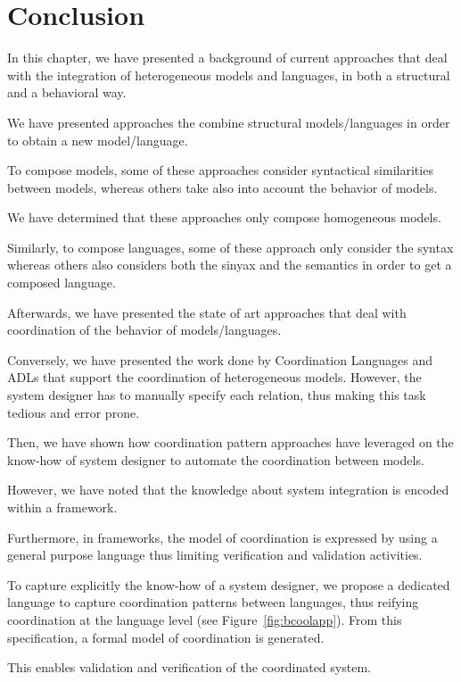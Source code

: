 \section{Conclusion}
In this chapter, we have presented a background of current approaches that deal with the integration of heterogeneous models and languages, in both a structural and a behavioral way. 

We have presented approaches the combine structural models/languages in order to obtain a new model/language. 

To compose models, some of these approaches consider syntactical similarities between models, whereas others take also into account the behavior of models. 

We have determined that these approaches only compose homogeneous models.    

Similarly, to compose languages, some of these approach only consider the syntax whereas others also considers both the sinyax and the semantics in order to get a composed language. 

 

Afterwards, we have presented the state of art approaches that deal with coordination of the behavior of models/languages. 





 Conversely, we have presented the work done by Coordination Languages and ADLs that support the coordination of heterogeneous models. However, the system designer has to manually specify each relation, thus making this task tedious and error prone.
 
 Then, we have shown how coordination pattern approaches have leveraged on the know-how of system designer to automate the coordination between models.
 
 However, we have noted that the knowledge about system integration is encoded within a framework. 
 
 Furthermore, in frameworks, the model of coordination is expressed by using a general purpose language thus limiting verification and validation activities. 

To capture explicitly the know-how of a system designer, we propose \bcool a dedicated language to capture coordination patterns between languages, thus reifying coordination at the language level (see Figure~\ref{fig:bcoolapp}). From this specification, a formal model of coordination is generated. 


This enables validation and verification of the coordinated system. 



